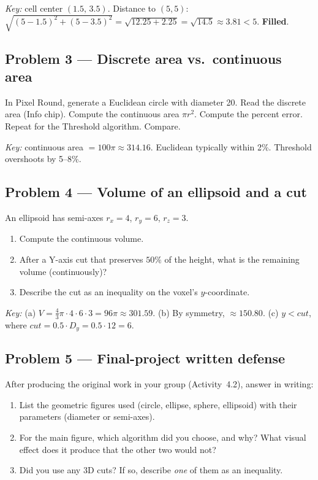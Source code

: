 \documentclass[12pt,letterpaper]{scrartcl}
\newcommand{\acc}[1]{\textcolor{accent}{\textbf{#1}}}
\begin{document}
\emph{Key:} cell center $(1.5,\, 3.5)$. Distance to $(5, 5)$: $\sqrt{(5-1.5)^2 + (5-3.5)^2} = \sqrt{12.25 + 2.25} = \sqrt{14.5} \approx 3.81 < 5$. \acc{Filled}.

\subsection*{Problem 3 --- Discrete area vs.\ continuous area}
In Pixel Round, generate a Euclidean circle with diameter 20. Read the discrete area (Info chip). Compute the continuous area $\pi r^2$. Compute the percent error. Repeat for the Threshold algorithm. Compare.

\emph{Key:} continuous area $= 100\pi \approx 314.16$. Euclidean typically within 2\%. Threshold overshoots by 5--8\%.

\subsection*{Problem 4 --- Volume of an ellipsoid and a cut}
An ellipsoid has semi-axes $r_x = 4$, $r_y = 6$, $r_z = 3$.
\begin{enumerate}[label=\alph*),leftmargin=1.5em,itemsep=0.1em,topsep=0.2em,nosep]
  \item Compute the continuous volume.
  \item After a Y-axis cut that preserves $50\%$ of the height, what is the remaining volume (continuously)?
  \item Describe the cut as an inequality on the voxel's $y$-coordinate.
\end{enumerate}

\emph{Key:} (a) $V = \tfrac{4}{3}\pi \cdot 4 \cdot 6 \cdot 3 = 96\pi \approx 301.59$.
(b) By symmetry, $\approx 150.80$.
(c) $y < \mathit{cut}$, where $\mathit{cut} = 0.5 \cdot D_y = 0.5 \cdot 12 = 6$.

\subsection*{Problem 5 --- Final-project written defense}
After producing the original work in your group (Activity~4.2), answer in writing:
\begin{enumerate}[label=(\arabic*),leftmargin=1.7em,itemsep=0.15em,topsep=0.2em,nosep]
  \item List the geometric figures used (circle, ellipse, sphere, ellipsoid) with their parameters (diameter or semi-axes).
  \item For the main figure, which algorithm did you choose, and why? What visual effect does it produce that the other two would not?
  \item Did you use any 3D cuts? If so, describe \emph{one} of them as an inequality.
\end{enumerate}
\end{document}
